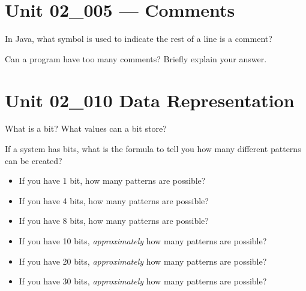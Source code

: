 \documentclass[letterpaper,12pt]{exam}
\newcommand{\unit}{Unit 02}
\begin{document}
\begin{questions}

\section*{\unit\_005 --- Comments} %

\begin{samepage}
	\question In Java, what symbol is used to indicate the rest of a line is a comment?
	\vspace{5mm}
\end{samepage}

\begin{samepage}
	\question Can a program have too many comments? Briefly explain your answer.
	\vspace{15mm}
\end{samepage}

\section*{\unit\_010 Data Representation} %
\begin{samepage}
	\question What is a bit?  What values can a bit store?
	\vspace{5mm}
\end{samepage}

\begin{samepage}
	\question If a system has  bits, what is the formula to tell you how many different patterns can be created?
	\vspace{5mm}
\end{samepage}

\begin{samepage}
	\question 
	  \begin{itemize}
		\item If you have 1 bit, how many patterns are possible?
		\vspace{5mm}
		\item If you have 4 bits, how many patterns are possible?
		\vspace{5mm}
		\item If you have 8 bits, how many patterns are possible?
		\vspace{5mm}
		\item If you have 10 bits, \emph{approximately} how many patterns are possible?
		\vspace{5mm}
		\item If you have 20 bits, \emph{approximately} how many patterns are possible?
		\vspace{5mm}
		\item If you have 30 bits, \emph{approximately} how many patterns are possible?
		\vspace{5mm}
		

\end{itemize}
\end{samepage}
\end{questions}
\end{document}
